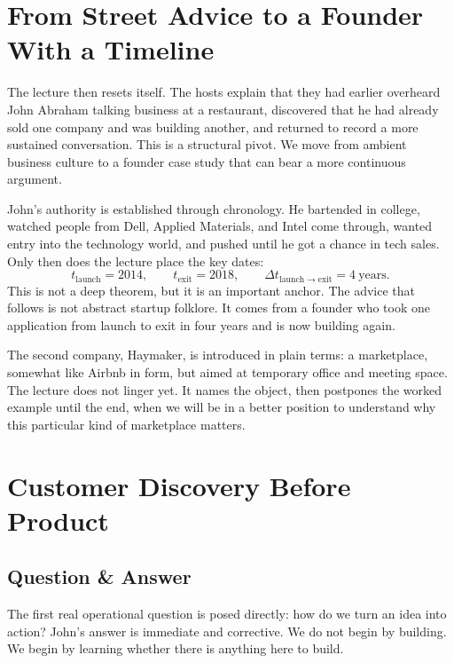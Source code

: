 \section{From Street Advice to a Founder With a Timeline}

The lecture then resets itself. The hosts explain that they had earlier overheard John Abraham talking business at a restaurant, discovered that he had already sold one company and was building another, and returned to record a more sustained conversation. This is a structural pivot. We move from ambient business culture to a founder case study that can bear a more continuous argument.

John's authority is established through chronology. He bartended in college, watched people from Dell, Applied Materials, and Intel come through, wanted entry into the technology world, and pushed until he got a chance in tech sales. Only then does the lecture place the key dates:
\begin{equation}
t_{\mathrm{launch}} = 2014,\qquad
t_{\mathrm{exit}} = 2018,\qquad
\Delta t_{\mathrm{launch\to exit}} = 4\ \text{years}.
\end{equation}
This is not a deep theorem, but it is an important anchor. The advice that follows is not abstract startup folklore. It comes from a founder who took one application from launch to exit in four years and is now building again.

The second company, Haymaker, is introduced in plain terms: a marketplace, somewhat like Airbnb in form, but aimed at temporary office and meeting space. The lecture does not linger yet. It names the object, then postpones the worked example until the end, when we will be in a better position to understand why this particular kind of marketplace matters.

\section{Customer Discovery Before Product}

\subsection{Question \& Answer}

The first real operational question is posed directly: how do we turn an idea into action? John's answer is immediate and corrective. We do not begin by building. We begin by learning whether there is anything here to build.

